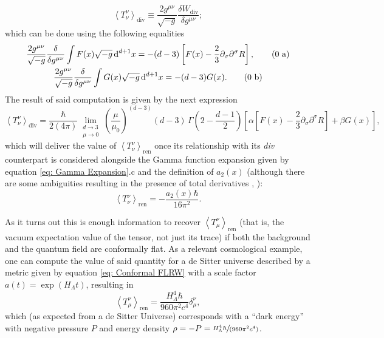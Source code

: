 \begin{equation}
	\left\langle T^\nu_\nu\right\rangle_{\text{div}}\equiv \frac{2g^{\mu\nu}}{\sqrt{-g}}\frac{\delta W_{\text{div}}}{\delta g^{\mu\nu}};
\end{equation}
which can be done using the following equalities \cite{Duff77}
\begin{subequations}
	\begin{gather}
		\frac{2g^{\mu\nu}}{\sqrt{-g}}\frac{\delta}{\delta g^{\mu\nu}}\int F(x)\sqrt{-g}\,\text{d}^{d+1}x=-(d-3)\left[F(x)-\frac{2}{3}\partial_\sigma\partial^\sigma R\right],\tag{\theequation \,\,a}\\
		\frac{2g^{\mu\nu}}{\sqrt{-g}}\frac{\delta}{\delta g^{\mu\nu}}\int G(x)\sqrt{-g}\,\text{d}^{d+1}x=-(d-3)G(x).\tag{\theequation \,\,b}
	\end{gather}
\end{subequations}
The result of said computation is given by the next expression
\begin{equation}
	\left\langle T^\nu_\nu\right\rangle_{\text{div}}=\frac{\hbar }{2(4\pi)}\lim\limits_{\substack{d\to 3 \\ \mu\to 0}}\left(\frac{\mu}{\mu_0}\right)^{(d-3)}\!\!\!\!(d-3)\,\Gamma\left(2-\frac{d-1}{2}\right)\left[\alpha\left[F(x)-\frac{2}{3}\partial_\sigma\partial^\sigma R\right]+\beta G(x)\right],
\end{equation}
which will deliver the value of $\left\langle T^\nu_\nu\right\rangle_{\text{ren}}$ once its relationship with its \textit{div} counterpart is considered alongside the Gamma function expansion given by equation \ref{eq: Gamma Expansion}.c and the definition of $a_2(x)$ (although there are some ambiguities resulting in the presence of total derivatives \cite{a2Ambig}, \cite{ASOREY}):
\begin{equation}
	\left\langle T^\nu_\nu\right\rangle_{\text{ren}}=-\frac{a_2(x)\hbar }{16\pi^2}.
\end{equation}

As it turns out \cite[sec. 6.4]{BirrelDavies} this is enough information to recover $\left\langle T^\nu_\mu\right\rangle_{\text{ren}}$ (that is, the vacuum expectation value of the tensor, not just its trace) if both the background and the quantum field are conformally flat. As a relevant cosmological example, one can compute the value of said quantity for a de Sitter universe described by a metric given by equation \ref{eq: Conformal FLRW} with a scale factor $a(t)=\exp{(H_\Lambda t)}$, resulting in 
\begin{equation}
	\left\langle T^\nu_\mu\right\rangle_{\text{ren}}=\frac{H_\Lambda^4\hbar}{960\pi^2c^4}\delta^\nu_\mu,
\end{equation}
which (as expected from a de Sitter Universe) corresponds with a ``dark energy'' with negative pressure $P$ and energy density $\rho=-P=\sfrac{H_\Lambda^4\hbar}{(960\pi^2c^4)}$.
